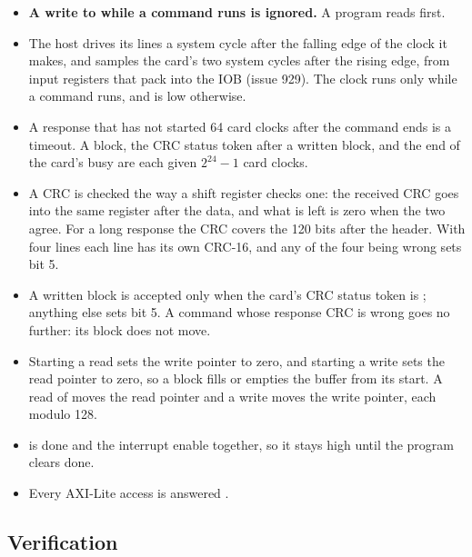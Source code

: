 \begin{itemize}
\item \textbf{A write to  while a command runs is ignored.}
A program reads  first.
\item The host drives its lines a system cycle after the falling edge
of the clock it makes, and samples the card's two system cycles after
the rising edge, from input registers that pack into the IOB
(issue 929). The clock runs only
while a command runs, and is low otherwise.
\item A response that has not started 64 card clocks after the command
ends is a timeout. A block, the CRC status token after a written
block, and the end of the card's busy are each given $2^{24} - 1$ card
clocks.
\item A CRC is checked the way a shift register checks one: the
received CRC goes into the same register after the data, and what is
left is zero when the two agree. For a long response the CRC covers
the 120 bits after the header. With four lines each line has its own
CRC-16, and any of the four being wrong sets bit 5.
\item A written block is accepted only when the card's CRC status
token is ; anything else sets bit 5. A command whose
response CRC is wrong goes no further: its block does not move.
\item Starting a read sets the write pointer to zero, and starting a
write sets the read pointer to zero, so a block fills or empties the
buffer from its start. A read of  moves the read pointer
and a write moves the write pointer, each modulo 128.
\item {} is done and the interrupt enable together, so it
stays high until the program clears done.
\item Every AXI-Lite access is answered .
\end{itemize}

\subsection*{Verification}

